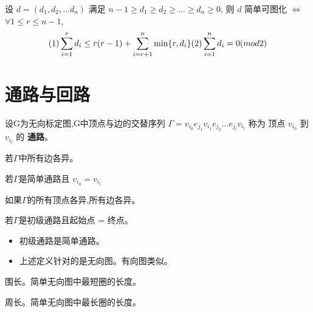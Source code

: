 \documentclass[11pt,fleqn]{book} %
\begin{document}
\begin{CJK}{UTF8}{gkai}
\begin{theorem}
     设 $d = (d_1, d_2 ,... d_n)$ 满足 $n-1 \geq d_1 \geq 
    d_2 \geq ... \geq d_n \geq 0$, 则 $d$ 简单可图化 $\iff$ $\forall 1 \leq r \leq n - 1$, 
    \[
        (1)\sum_{i = 1}^r d_i \leq r(r -1) + \sum_{i = r + 1}^{n} \min\{r, d_i\} \newline (2) \sum_{i = 1}^{n} d_i = 0 (mod 2)
        \]
\end{theorem}
\section{通路与回路}

\begin{definition}[通路]
    设G为无向标定图,G中顶点与边的交替序列 $\Gamma = v_{i_0}e_{j_1}v_{i_1}e_{j_2}...e_{j_l}v_{i_l}$ 称为
    顶点 $v_{i_0}$ 到 $v_{i_l}$ 的 \textbf{通路}。
\end{definition}

\begin{definition}
    [简单通路]
    若$\Gamma$中所有边各异。
\end{definition}
\begin{definition}
    [简单回路]
    若$\Gamma$是简单通路且 $v_{i_0} = v_{i_l}$
\end{definition}

\begin{definition}
    [初级通路，路径]
    如果$\Gamma$的所有顶点各异,所有边各异。
\end{definition}

\begin{definition}
  [初级回路，圈] 
  若$\Gamma$是初级通路且起始点 = 终点。   
\end{definition}

\begin{remark}
    \begin{itemize}
        \item 初级通路是简单通路。
        \item 上述定义针对的是无向图。有向图类似。
    \end{itemize}
    
\end{remark}
\begin{definition}
    [Girth] 围长。简单无向图中最短圈的长度。
\end{definition}
\begin{definition}
    [Perimeter] 周长。简单无向图中最长圈的长度。
\end{definition}


\end{CJK}
\end{document}
